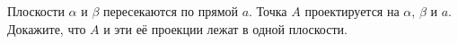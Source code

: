 Плоскости $\alpha$ и $\beta$ пересекаются по прямой $a$. Точка $A$ проектируется на $\alpha$, $\beta$ и $a$. Докажите, что $A$ и эти её проекции лежат в одной плоскости.